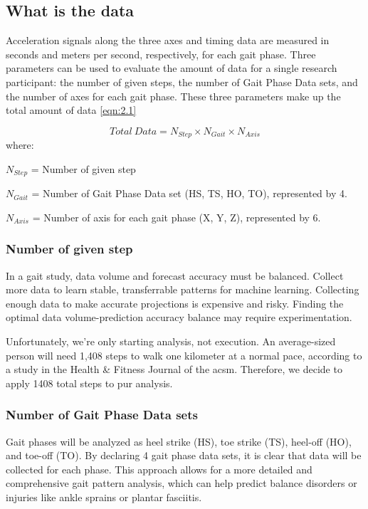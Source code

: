 \subsection{What is the data}
\label{subsection: what is the data}

Acceleration signals along the three axes and timing data are measured in seconds and meters per second, respectively, for each gait phase. Three parameters can be used to evaluate the amount of data for a single research participant: the number of given steps, the number of Gait Phase Data sets, and the number of axes for each gait phase. These three parameters make up the total amount of data \ref{eqn:2.1}

\begin{equation}
\label{eqn:2.1}
    Total\:Data = N_{Step} \times N_{Gait} \times N_{Axis}
\end{equation}
where: 

$N_{Step}$ = Number of given step

$N_{Gait}$ = Number of Gait Phase Data set (HS, TS, HO, TO), represented by 4.

$N_{Axis}$ = Number of axis for each gait phase (X, Y, Z), represented by 6.

\subsubsection{Number of given step}
\label{subsubsection: Number of given step}

In a gait study, data volume and forecast accuracy must be balanced. Collect more data to learn stable, transferrable patterns for machine learning. Collecting enough data to make accurate projections is expensive and risky. Finding the optimal data volume-prediction accuracy balance may require experimentation.

\bigskip

Unfortunately, we're only starting analysis, not execution. An average-sized person will need 1,408 steps to walk one kilometer at a normal pace, according to a study in the Health \& Fitness Journal of the \ac{acsm}. Therefore, we decide to apply 1408 total steps to pur analysis. \cite{Hoeger2008}

\subsubsection{Number of Gait Phase Data sets}

Gait phases will be analyzed as heel strike (HS), toe strike (TS), heel-off (HO), and toe-off (TO). By declaring 4 gait phase data sets, it is clear that data will be collected for each phase. This approach allows for a more detailed and comprehensive gait pattern analysis, which can help predict balance disorders or injuries like ankle sprains or plantar fasciitis.

